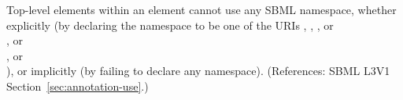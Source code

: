 Top-level elements within an  element cannot use any SBML
namespace, whether explicitly (by declaring the namespace to be one of the
URIs ,
, 
, or\\
, or\\
, or\\
), or implicitly (by failing
to declare any namespace).  (References: SBML L3V1 Section~\ref{sec:annotation-use}.)

